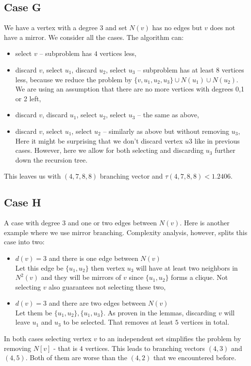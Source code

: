 \subsection{Case G}
We have a vertex with a degree $3$ and set $N(v)$ has no edges but $v$ does not have a mirror. We consider all the cases. 
The algorithm can:
\begin{itemize}
    \item select $v$ -- subproblem has $4$ vertices less,
    \item discard $v$, select $u_1$, discard $u_2$, select $u_3$ -- subproblem has at least $8$ vertices less, because we reduce the problem by $\{v, u_1, u_2, u_3\} \cup N(u_1) \cup N(u_2)$. We are using an assumption that there are no more vertices with degrees 0,1 or 2 left,
    \item discard $v$, discard $u_1$, select $u_2$, select $u_3$ -- the same as above,
    \item discard $v$, select $u_1$, select $u_2$ -- similarly as above but without removing $u_3$,
    Here it might be surprising that we don't discard vertex $u3$ like in previous cases. However, here we allow for both selecting and discarding $u_3$ further down the recursion tree.
\end{itemize}
This leaves us with $(4,7,8,8)$ branching vector and $\tau(4,7,8,8) < 1.2406$.

\subsection{Case H}
A case with degree $3$ and one or two edges between $N(v)$. Here is another example where we use mirror branching. Complexity analysis, however, splits this case into two:
\begin{itemize}
    \item $d(v)=3$ and there is one edge between $N(v)$\\
    Let this edge be $\{u_1, u_2\}$ then vertex $u_3$ will have at least two neighbors in $N^2(v)$ and they will be mirrors of $v$ since $\{u_1, u_2\}$ forms a clique. Not selecting $v$ also guarantees not selecting these two,
    \item $d(v)=3$ and there are two edges between $N(v)$\\
    Let them be $\{u_1, u_2\},\{u_1, u_3\}$. As proven in the lemmas, discarding $v$ will leave $u_1$ and $u_3$ to be selected. That removes at least $5$ vertices in total.
\end{itemize}
In both cases selecting vertex $v$ to an independent set simplifies the problem by removing $N[v]$ - that is $4$ vertices. This leads to branching vectors $(4,3)$ and $(4,5)$. Both of them are worse than the $(4,2)$ that we encountered before.

